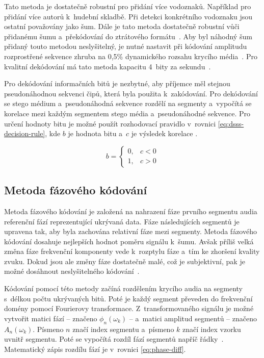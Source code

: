Tato metoda je dostatečně robustní pro přidání více vodoznaků. Například pro
přidání více autorů k~hudební skladbě. Při detekci konkrétního vodoznaku jsou
ostatní považovány jako šum. Dále je tato metoda dostatečně robustní vůči
přidanému šumu a~překódování do ztrátového formátu~\cite{Boney1996}. Aby byl
náhodný šum přidaný touto metodou neslyšitelný, je nutné nastavit při kódování
amplitudu rozprostřené sekvence zhruba na 0,5\% dynamického rozsahu krycího
média~\cite{Bender1996}. Pro kvalitní dekódování má tato metoda kapacitu 4~bity
za sekundu~\cite{Bender1996}.

Pro dekódování informačních bitů je nezbytné, aby příjemce měl stejnou
pseudonáhodnou sekvenci čipů, která byla použita k~zakódování. Pro dekódování
se stego médium a~pseudonáhodná sekvence rozdělí na segmenty a~vypočítá se
korelace mezi každým segmentem stego média a~pseudonáhodné sekvence. Pro určení
hodnoty bitu je možné použít rozhodovací pravidlo v~rovnici
\ref{eq:dsss-decision-rule}, kde $b$ je hodnota bitu a~$c$ je výsledek korelace
\cite{Kuznetsov2022}.

\begin{equation}
    \label{eq:dsss-decision-rule}
    b = \left\{
        \begin{array}{rl}
            0, & c < 0 \\
            1, & c > 0
        \end{array}
    \right.
\end{equation}

\subsection*{Metoda fázového kódování}
\label{sub:phase-coding}

Metoda fázového kódování je založená na nahrazení fáze prvního segmentu audia
referenční fází reprezentující ukrývaná data. Fáze následujících segmentů je
upravena tak, aby byla zachována relativní fáze mezi segmenty. Metoda fázového
kódování dosahuje nejlepších hodnot poměru signálu k~šumu. Avšak příliš velká
změna fáze frekvenční komponenty vede k~rozptylu fáze a~tím ke zhoršení kvality
zvuku. Dokud jsou ale změny fáze dostatečně malé, což je subjektivní, pak je
možné dosáhnout neslyšitelného kódování~\cite{Bender1996}.

Kódování pomocí této metody začíná rozdělením krycího audia na segmenty
s~délkou počtu ukrývaných bitů. Poté je každý segment převeden do frekvenční
domény pomocí Fourierovy transformace. Z~transformovaného signálu je možné
vytvořit matici fází -- značeno $\phi_n(\omega_k)$ -- a~matici amplitud
segmentů -- značeno $A_n(\omega_k)$. Písmeno $n$ značí index segmentu a~písmeno
$k$ značí index vzorku uvnitř segmentu. Poté se vypočítá rozdíl fází segmentů
napříč řádky~\cite{Bender1996}. Matematický zápis rozdílu fází je v~rovnici
\ref{eq:phase-diff}.

